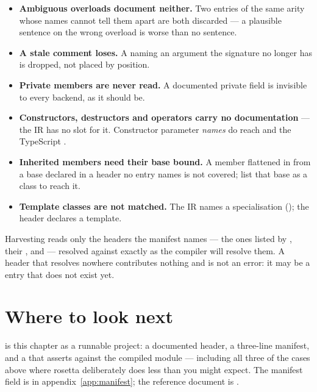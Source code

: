 \begin{itemize}[leftmargin=*]
  \item \textbf{Ambiguous overloads document neither.} Two entries of the same
    arity whose names cannot tell them apart are both discarded --- a plausible
    sentence on the wrong overload is worse than no sentence.
  \item \textbf{A stale comment loses.} A  naming an
    argument the signature no longer has is dropped, not placed by position.
  \item \textbf{Private members are never read.} A documented private field is
    invisible to every backend, as it should be.
  \item \textbf{Constructors, destructors and operators carry no documentation}
    --- the IR has no slot for it. Constructor parameter \emph{names} do reach
     and the TypeScript .
  \item \textbf{Inherited members need their base bound.} A member flattened in
    from a base declared in a header no  entry names is not
    covered; list that base as a class to reach it.
  \item \textbf{Template classes are not matched.} The IR names a
    specialisation (); the header declares a template.
\end{itemize}

\begin{note}
Harvesting reads only the headers the manifest names --- the ones listed by
, their , and  --- resolved
against  exactly as the compiler will resolve them. A
header that resolves nowhere contributes nothing and is not an error: it may be
a  entry that does not exist yet.
\end{note}

\section{Where to look next}

 is this chapter as a runnable project: a documented
header, a three-line manifest, and a  that asserts against the
compiled module --- including all three of the cases above where rosetta
deliberately does less than you might expect. The manifest field is in
appendix~\ref{app:manifest}; the reference document is
.
